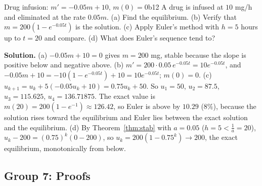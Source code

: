 \documentclass[11pt]{article}
\begin{document}
\begin{exmp}{Drug infusion: $m'=-0.05m+10$, $m(0)=0$}{b12}
A drug is infused at $10$ mg/h and eliminated at the rate $0.05m$. (a) Find the equilibrium. (b) Verify that $m=200\left(1-e^{-0.05t}\right)$ is the solution. (c) Apply Euler's method with $h=5$ hours up to $t=20$ and compare. (d) What does Euler's sequence tend to?

\textbf{Solution.} (a) $-0.05m+10=0$ gives $m=200$ mg, stable because the slope is positive below and negative above. (b) $m'=200\cdot0.05\,e^{-0.05t}=10e^{-0.05t}$, and $-0.05m+10=-10(1-e^{-0.05t})+10=10e^{-0.05t}$; $m(0)=0$.
(c) $u_{k+1}=u_k+5(-0.05u_k+10)=0.75u_k+50$. So $u_1=50$, $u_2=87.5$, $u_3=115.625$, $u_4=136.71875$. The exact value is $m(20)=200(1-e^{-1})\approx126.42$, so Euler is above by $10.29$ ($8\%$), because the solution rises toward the equilibrium and Euler lies between the exact solution and the equilibrium.
(d) By Theorem~\ref{thm:stab} with $a=0.05$ ($h=5<\frac1a=20$), $u_k-200=(0.75)^k(0-200)$, so $u_k=200\left(1-0.75^k\right)\to200$, the exact equilibrium, monotonically from below.
\end{exmp}

\subsection*{Group 7: Proofs}
\end{document}
